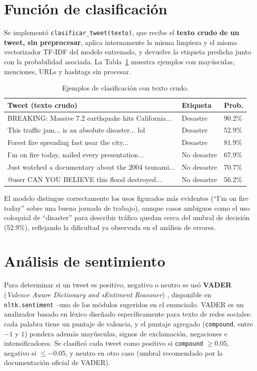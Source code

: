 \documentclass[11pt]{article}
\begin{document}
\section{Funci\'on de clasificaci\'on}

Se implement\'o \texttt{clasificar\_tweet(texto)}, que recibe el \textbf{texto crudo
de un tweet, sin preprocesar}, aplica internamente la misma limpieza y el mismo
vectorizador TF-IDF del modelo entrenado, y devuelve la etiqueta predicha junto con la
probabilidad asociada. La Tabla~\ref{tab:ejemplos_clasificacion} muestra ejemplos con
may\'usculas, menciones, URLs y hashtags sin procesar.

\begin{table}[H]
\centering
\caption{Ejemplos de clasificaci\'on con texto crudo.}
\label{tab:ejemplos_clasificacion}
\small
\begin{tabular}{p{9.5cm}ll}
\toprule
Tweet (texto crudo) & Etiqueta & Prob. \\
\midrule
BREAKING: Massive 7.2 earthquake hits California... & Desastre & 90.2\% \\
This traffic jam... is an absolute disaster... lol & Desastre & 52.9\% \\
Forest fire spreading fast near the city... & Desastre & 81.9\% \\
I'm on fire today, nailed every presentation... & No desastre & 67.9\% \\
Just watched a documentary about the 2004 tsunami... & No desastre & 70.7\% \\
@user CAN YOU BELIEVE this flood destroyed... & No desastre & 56.2\% \\
\bottomrule
\end{tabular}
\end{table}

El modelo distingue correctamente los usos figurados m\'as evidentes (``I'm on fire
today'' sobre una buena jornada de trabajo), aunque casos ambiguos como el uso
coloquial de ``disaster'' para describir tr\'afico quedan cerca del umbral de decisi\'on
(52.9\%), reflejando la dificultad ya observada en el an\'alisis de errores.

\section{An\'alisis de sentimiento}
\label{sec:sentimiento}

Para determinar si un tweet es positivo, negativo o neutro se us\'o \textbf{VADER}
(\emph{Valence Aware Dictionary and sEntiment Reasoner}) \cite{vader2014}, disponible en
\texttt{nltk.sentiment} --uno de los m\'odulos sugeridos en el enunciado. VADER es un
analizador basado en l\'exico dise\~nado espec\'ificamente para texto de redes sociales:
cada palabra tiene un puntaje de valencia, y el puntaje agregado (\texttt{compound},
entre $-1$ y $1$) pondera adem\'as may\'usculas, signos de exclamaci\'on, negaciones e
intensificadores. Se clasific\'o cada tweet como positivo si \texttt{compound}
$\geq 0.05$, negativo si $\leq -0.05$, y neutro en otro caso (umbral recomendado por la
documentaci\'on oficial de VADER).
\end{document}
